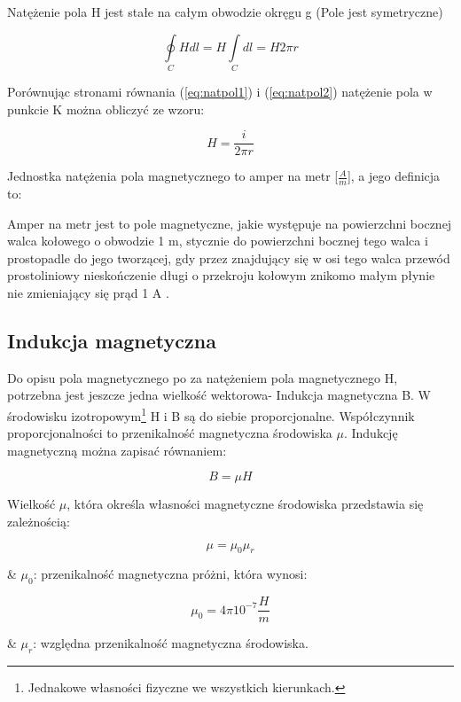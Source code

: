 Natężenie pola H jest stałe na całym obwodzie okręgu g (Pole jest symetryczne)

\begin{equation} \label{eq:natpol2}
	\oint\limits_C H dl = H \int\limits_C dl = H 2 \pi r
\end{equation}

Porównując stronami równania (\ref{eq:natpol1}) i (\ref{eq:natpol2}) natężenie pola w punkcie K można obliczyć ze wzoru:

\begin{equation} \label{eq:natpol3}
	H = \frac{i}{2 \pi r}
\end{equation}

Jednostka natężenia pola magnetycznego to amper na metr [$ \frac{A}{m} $], a jego definicja to:
	   
\begin{defn}
	Amper na metr jest to pole magnetyczne, jakie występuje na powierzchni bocznej walca kołowego o obwodzie 1 m, stycznie do powierzchni bocznej tego walca i prostopadle do jego tworzącej, gdy przez znajdujący się w osi tego walca przewód prostoliniowy nieskończenie długi o przekroju kołowym znikomo małym płynie nie zmieniający się prąd 1 A \cite{kaluszko}.
\end{defn}

\subsection{Indukcja magnetyczna}

Do opisu pola magnetycznego po za natężeniem pola magnetycznego H, potrzebna jest jeszcze jedna wielkość wektorowa- Indukcja magnetyczna B. W środowisku izotropowym\footnote{Jednakowe własności fizyczne we wszystkich kierunkach.} H i B są do siebie proporcjonalne. Współczynnik proporcjonalności to przenikalność magnetyczna środowiska $ \mu $. Indukcję magnetyczną można zapisać równaniem:

\begin{equation} \label{eq:indmag1}
	B = \mu H
\end{equation}

Wielkość $ \mu $, która określa własności magnetyczne środowiska przedstawia się zależnością:

\begin{equation} \label{eq:indmag2}
	\mu = \mu_0 \mu_r
\end{equation}

\begin{easylist}
	& $ \mu_0 $: przenikalność magnetyczna próżni, która wynosi:
	
	\begin{equation} \label{eq:indmag3}
		\mu_0 = 4 \pi 10^{-7} \frac{H}{m}
	\end{equation}
	
	& $ \mu_r $: względna przenikalność magnetyczna środowiska.
	\\
\end{easylist} 

